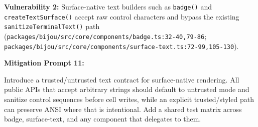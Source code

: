 \textbf{Vulnerability 2:} Surface-native text builders such as \texttt{b\allowbreak{}a\allowbreak{}d\allowbreak{}g\allowbreak{}e\allowbreak{}(\allowbreak{})} and \texttt{c\allowbreak{}r\allowbreak{}e\allowbreak{}a\allowbreak{}t\allowbreak{}e\allowbreak{}T\allowbreak{}e\allowbreak{}x\allowbreak{}t\allowbreak{}S\allowbreak{}u\allowbreak{}r\allowbreak{}f\allowbreak{}a\allowbreak{}c\allowbreak{}e\allowbreak{}(\allowbreak{})} accept raw control characters and bypass the existing \texttt{s\allowbreak{}a\allowbreak{}n\allowbreak{}i\allowbreak{}t\allowbreak{}i\allowbreak{}z\allowbreak{}e\allowbreak{}T\allowbreak{}e\allowbreak{}r\allowbreak{}m\allowbreak{}i\allowbreak{}n\allowbreak{}a\allowbreak{}l\allowbreak{}T\allowbreak{}e\allowbreak{}x\allowbreak{}t\allowbreak{}(\allowbreak{})} path (\texttt{p\allowbreak{}a\allowbreak{}c\allowbreak{}k\allowbreak{}a\allowbreak{}g\allowbreak{}e\allowbreak{}s\allowbreak{}/\allowbreak{}b\allowbreak{}i\allowbreak{}j\allowbreak{}o\allowbreak{}u\allowbreak{}/\allowbreak{}s\allowbreak{}r\allowbreak{}c\allowbreak{}/\allowbreak{}c\allowbreak{}o\allowbreak{}r\allowbreak{}e\allowbreak{}/\allowbreak{}c\allowbreak{}o\allowbreak{}m\allowbreak{}p\allowbreak{}o\allowbreak{}n\allowbreak{}e\allowbreak{}n\allowbreak{}t\allowbreak{}s\allowbreak{}/\allowbreak{}b\allowbreak{}a\allowbreak{}d\allowbreak{}g\allowbreak{}e\allowbreak{}.\allowbreak{}t\allowbreak{}s\allowbreak{}:\allowbreak{}3\allowbreak{}2\allowbreak{}-\allowbreak{}4\allowbreak{}0\allowbreak{},\allowbreak{}7\allowbreak{}9\allowbreak{}-\allowbreak{}8\allowbreak{}6}; \texttt{p\allowbreak{}a\allowbreak{}c\allowbreak{}k\allowbreak{}a\allowbreak{}g\allowbreak{}e\allowbreak{}s\allowbreak{}/\allowbreak{}b\allowbreak{}i\allowbreak{}j\allowbreak{}o\allowbreak{}u\allowbreak{}/\allowbreak{}s\allowbreak{}r\allowbreak{}c\allowbreak{}/\allowbreak{}c\allowbreak{}o\allowbreak{}r\allowbreak{}e\allowbreak{}/\allowbreak{}c\allowbreak{}o\allowbreak{}m\allowbreak{}p\allowbreak{}o\allowbreak{}n\allowbreak{}e\allowbreak{}n\allowbreak{}t\allowbreak{}s\allowbreak{}/\allowbreak{}s\allowbreak{}u\allowbreak{}r\allowbreak{}f\allowbreak{}a\allowbreak{}c\allowbreak{}e\allowbreak{}-\allowbreak{}t\allowbreak{}e\allowbreak{}x\allowbreak{}t\allowbreak{}.\allowbreak{}t\allowbreak{}s\allowbreak{}:\allowbreak{}7\allowbreak{}2\allowbreak{}-\allowbreak{}9\allowbreak{}9\allowbreak{},\allowbreak{}1\allowbreak{}0\allowbreak{}5\allowbreak{}-\allowbreak{}1\allowbreak{}3\allowbreak{}0}).

\textbf{Mitigation Prompt 11:}

\begin{CodeBlock}
Introduce a trusted/untrusted text contract for surface-native rendering. All public APIs that accept arbitrary strings should default to untrusted mode and sanitize control sequences before cell writes, while an explicit trusted/styled path can preserve ANSI where that is intentional. Add a shared test matrix across badge, surface-text, and any component that delegates to them.
\end{CodeBlock}

